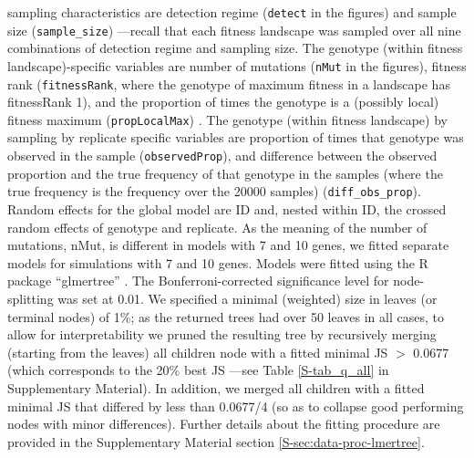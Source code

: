 \documentclass[a4paper,10pt]{article}
\begin{document}
sampling characteristics are detection regime (\texttt{detect} in the figures) and
sample size (\texttt{sample\_size}) ---recall that each fitness landscape was
sampled over all nine combinations of detection regime and sampling
size. The genotype (within fitness landscape)-specific variables are
number of mutations (\texttt{nMut} in the figures), fitness rank (\texttt{fitnessRank},
where the genotype of maximum fitness in a landscape has fitnessRank 1),
and the proportion of times the genotype is a (possibly local) fitness
maximum (\texttt{propLocalMax}) . The genotype (within fitness landscape) by
sampling by replicate specific variables are proportion of
times that genotype was observed in the sample (\texttt{observedProp}), and
difference between the observed proportion and the true frequency of that
genotype in the samples (where the true frequency is the frequency over
the 20000 samples) (\texttt{diff\_obs\_prop}). Random effects for the global model
are ID and, nested within ID, the crossed random effects of genotype and
replicate. As the meaning of the number of mutations, nMut, is different
in models with 7 and 10 genes, we fitted separate models for simulations
with 7 and 10 genes.
Models were fitted using the R package ``glmertree''
\cite{fokkema2018}. The Bonferroni-corrected significance level for
node-splitting was set at 0.01. We specified a minimal (weighted) size in
leaves (or terminal nodes) of 1\%; as the returned trees had over 50
leaves in all cases, to allow for interpretability we pruned the resulting
tree by recursively merging (starting from the leaves) all children node
with a fitted minimal JS $>$ 0.0677 (which corresponds to the 20\% best JS
---see Table \ref{S-tab_q_all} in Supplementary Material). In addition, we
merged all children with a fitted minimal JS that differed by less than
0.0677/4 (so as to collapse good performing nodes with minor
differences). Further details about the fitting procedure are provided in
the Supplementary Material section \ref{S-sec:data-proc-lmertree}.
\end{document}
